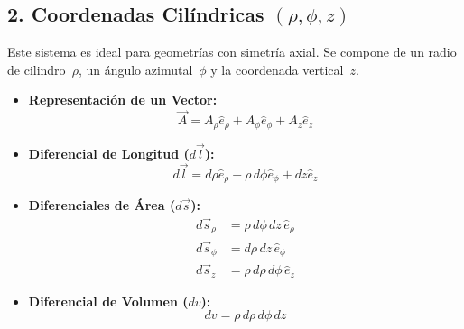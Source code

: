 \documentclass[11pt, a4paper]{article}
\begin{document}
\vspace{0.3cm}

\subsection{2. Coordenadas Cilíndricas $(\rho, \phi, z)$}

Este sistema es ideal para geometrías con simetría axial. Se compone de un radio de cilindro~$\rho$, un ángulo azimutal~$\phi$ y la coordenada vertical~$z$.

\begin{itemize}
    \item \textbf{Representación de un Vector:}
    $$\vec{A} = A_\rho\hat{e}_\rho + A_\phi\hat{e}_\phi + A_z\hat{e}_z$$
    
    \item \textbf{Diferencial de Longitud ($d\vec{l}$):}
    $$d\vec{l} = d\rho\hat{e}_\rho + \rho\,d\phi\hat{e}_\phi + dz\hat{e}_z$$
    
    \item \textbf{Diferenciales de Área ($d\vec{s}$):}
    \begin{align*}
        d\vec{s}_\rho &= \rho\,d\phi\,dz\,\hat{e}_\rho \\
        d\vec{s}_\phi &= d\rho\,dz\,\hat{e}_\phi \\
        d\vec{s}_z &= \rho\,d\rho\,d\phi\,\hat{e}_z
    \end{align*}
    
    \item \textbf{Diferencial de Volumen ($dv$):}
    $$\boxed{dv = \rho\,d\rho\,d\phi\,dz}$$
\end{itemize}
\end{document}
